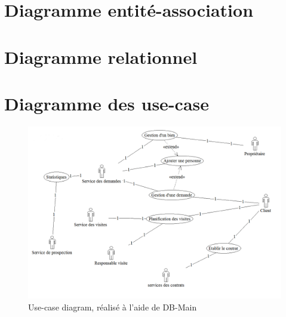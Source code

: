 \section{Diagramme entité-association}
\section{Diagramme relationnel}
\section{Diagramme des use-case}
\label{diagUC}
\begin{figure}[H]
\centering
\includegraphics[width=16cm]{use-case.png}
\caption{Use-case diagram, réalisé à l'aide de DB-Main}
\end{figure}